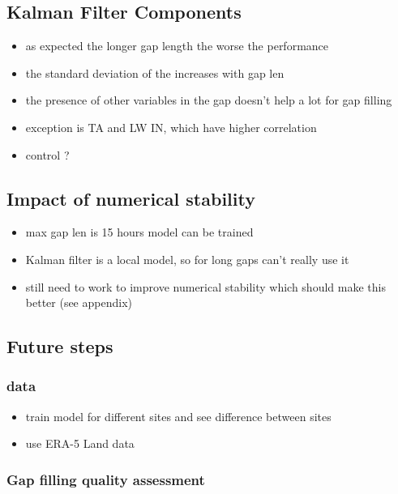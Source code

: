 \documentclass{article}
\let\Oldsubsection\subsection
\renewcommand{\subsection}{\FloatBarrier\Oldsubsection}
\let\Oldsubsubsection\subsubsection
\renewcommand{\subsubsection}{\FloatBarrier\Oldsubsubsection}
\begin{document}
\subsection{Kalman Filter Components}

\begin{itemize}
    \item as expected the longer gap length the worse the performance
    \item the standard deviation of the increases with gap len
\end{itemize}

\begin{itemize}
    \item the presence of other variables in the gap doesn't help a lot for gap filling
    \item exception is TA and LW IN, which have higher correlation
    \item control ?
\end{itemize}


\subsection{Impact of numerical stability}

\begin{itemize}
    \item max gap len is 15 hours model can be trained
    \item Kalman filter is a local model, so for long gaps can't really use it
    \item still need to work to improve numerical stability which should make this better (see appendix)
\end{itemize}


\subsection{Future steps}

\subsubsection{data}
\begin{itemize}
    \item train model for different sites and see difference between sites
    \item use ERA-5 Land data
\end{itemize}

\subsubsection{Gap filling quality assessment}
\end{document}
